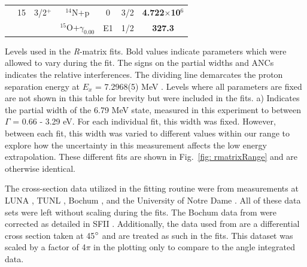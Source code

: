 \begin{table}[]
\begin{center}
\begin{threeparttable}
\begin{tabular}{c  c  c  c  c  c  c}
& {15}	&	3/2$^+$	&	$^{14}$N+p	&	0	&	3/2	&	\textbf{4.722$\times$10$^6$}\\
	&	&	&	$^{15}$O+$\gamma_{0.00}$	&	E1	&	1/2	&	\textbf{327.3}	\\
\bottomrule
\end{tabular}
\begin{tablenotes}
\small 
\item Levels used in the \textit{R}-matrix fits. Bold values indicate parameters which were allowed to vary during the fit. The signs on the partial widths and ANCs indicates the relative interferences. The dividing line demarcates the proton separation energy at $E_x$ = 7.2968(5) MeV \cite{Ajzenberg-Selove1991}. Levels where all parameters are fixed are not shown in this table for brevity but were included in the fits. a) Indicates the partial width of the 6.79 MeV state, measured in this experiment to between $\Gamma$ = 0.66 - 3.29 eV. For each individual fit, this width was fixed. However, between each fit, this width was varied to different values within our range to explore how the uncertainty in this measurement affects the low energy extrapolation. These different fits are shown in Fig.\ \ref{fig: rmatrixRange} and are otherwise identical.
\end{tablenotes}
\end{threeparttable}
\label{table: fitParams}
\end{center}
\end{table}  



The cross-section data utilized in the fitting routine were from measurements at LUNA \cite{Formicola2004, Imbriani2005, Marta2008, Marta2011}, TUNL \cite{Runkle2005}, Bochum \cite{Schroder1987}, and the University of Notre Dame \cite{Li2016}. All of these data sets were left without scaling during the fits. The Bochum data from \citet{Schroder1987} were corrected as detailed in SFII \cite{Adelberger2011}. Additionally, the data used from \citet{Li2016} are a differential cross section taken at 45$\degree$ and are treated as such in the fits. This dataset was scaled by a factor of 4$\pi$ in the plotting only to compare to the angle integrated data. 

